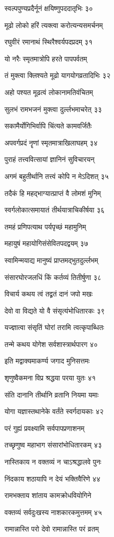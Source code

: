 स्वल्पपुण्यप्रदैर्नूनं क्षयिष्णुपददातृभिः ३०

मूढो लोको हरिं त्यक्त्वा करोत्यन्यसमर्चनम्

रघुवीरं रमानाथं स्थिरैश्वर्यपदप्रदम् ३१

यो नरैः स्मृतमात्रोपि हरते पापपर्वतम्

तं मुक्त्वा क्लिश्यते मूढो यागयोगव्रतादिभिः ३२

अहो पश्यत मूढत्वं लोकानामतिवंचितम्

सुलभं रामभजनं मुक्त्वा दुर्ल्लभमाचरेत् ३३

सकामैर्योगिभिर्वापि चिंत्यते कामवर्जितैः

अपवर्गप्रदं नॄणां स्मृतमात्राखिलाघहम् ३४

पुराहं तत्त्ववित्सायां ज्ञानिनं सुविचारयन्

अगमं बहुतीर्थानि तत्त्वं कोपि न मेऽदिशत् ३५

तदैकं हि महद्भाग्यात्प्राप्तं वै लोमशं मुनिम्

स्वर्गलोकात्समायातं तीर्थयात्राचिकीर्षया ३६

तमहं प्रणिपत्याथ पर्यपृच्छं महामुनिम्

महायुषं महायोगिसंसेवितपदद्वयम् ३७

स्वामिन्मयाद्य मानुष्यं प्राप्तमद्भुतदुर्ल्लभम्

संसारघोरजलधिं किं कर्तव्यं तितीर्षुणा ३८

विचार्य कथय त्वं तद्व्रतं दानं जपो मखः

देवो वा विद्यते यो वै संसृत्यंभोधितारकः ३९

यज्ज्ञात्वा संसृतिं घोरां तरामि त्वत्कृपाब्धितः

तन्मे कथय योगेश सर्वशास्त्रार्थपारग ४०

इति मद्वाक्यमाकर्ण्य जगाद मुनिसत्तमः

शृणुष्वैकमना विप्र श्रद्धया परया युतः ४१

संति दानानि तीर्थानि व्रतानि नियमा यमाः

योगा यज्ञास्तथानेके वर्तंते स्वर्गदायकाः ४२

परं गुह्यं प्रवक्ष्यामि सर्वपापप्रणाशनम्

तच्छृणुष्व महाभाग संसारांभोधितारकम् ४३

नास्तिकाय न वक्तव्यं न चाऽश्रद्धालवे पुनः

निंदकाय शठायापि न देयं भक्तिवैरिणे ४४

रामभक्ताय शांताय कामक्रोधवियोगिने

वक्तव्यं सर्वदुःखस्य नाशकारकमुत्तमम् ४५

रामान्नास्ति परो देवो रामान्नास्ति परं व्रतम्

